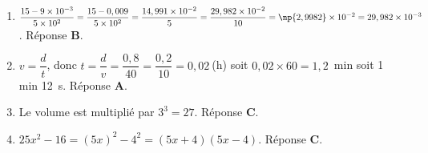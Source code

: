
\medskip

%
\begin{enumerate}
\item $\dfrac{15 - 9 \times  10^{-3}}{5 \times  10^2} = \dfrac{15 - 0,009}{5 \times  10^2} = \dfrac{14,991 \times 10^{-2}}{5} = \dfrac{29,982 \times 10^{-2}}{10} = \np{2,9982}\times 10^{-2} = 29,982 \times 10^{-3}$. Réponse \textbf{B}.
\item $v = \dfrac{d}{t}$, donc $t = \dfrac{d}{v} = \dfrac{0,8}{40}  =\dfrac{0,2}{10} = 0,02~$(h) soit $0,02 \times 60 = 1,2$~min soit 1 min 12~s. Réponse \textbf{A}.
\item Le volume est multiplié par $3^3 = 27$. Réponse \textbf{C}.
\item $25x^2 - 16 = (5x)^2 - 4^2 = (5x + 4)(5x - 4)$. Réponse \textbf{C}.
\end{enumerate}
 
\bigskip

